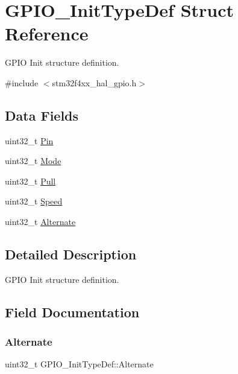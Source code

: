 \hypertarget{struct_g_p_i_o___init_type_def}{}\section{G\+P\+I\+O\+\_\+\+Init\+Type\+Def Struct Reference}
\label{struct_g_p_i_o___init_type_def}


G\+P\+IO Init structure definition.  




{\ttfamily \#include $<$stm32f4xx\+\_\+hal\+\_\+gpio.\+h$>$}

\subsection*{Data Fields}
\begin{DoxyCompactItemize}
\item 
uint32\+\_\+t \hyperlink{struct_g_p_i_o___init_type_def_aa807fb62b2b2cf937092abba81370b87}{Pin}
\item 
uint32\+\_\+t \hyperlink{struct_g_p_i_o___init_type_def_a3731d84343e65a98fdf51056a8d30321}{Mode}
\item 
uint32\+\_\+t \hyperlink{struct_g_p_i_o___init_type_def_aa2d3a6b0c4e10ac20882b4a37799ced1}{Pull}
\item 
uint32\+\_\+t \hyperlink{struct_g_p_i_o___init_type_def_aae3b8ba407fb4f974cbce9cc03fc189d}{Speed}
\item 
uint32\+\_\+t \hyperlink{struct_g_p_i_o___init_type_def_aa1bf7132c974a10589d6574d50465256}{Alternate}
\end{DoxyCompactItemize}


\subsection{Detailed Description}
G\+P\+IO Init structure definition. 

\subsection{Field Documentation}
\mbox{\label{struct_g_p_i_o___init_type_def_aa1bf7132c974a10589d6574d50465256}} 
\subsubsection{\texorpdfstring{Alternate}{Alternate}}
{\footnotesize\ttfamily uint32\+\_\+t G\+P\+I\+O\+\_\+\+Init\+Type\+Def\+::\+Alternate}

